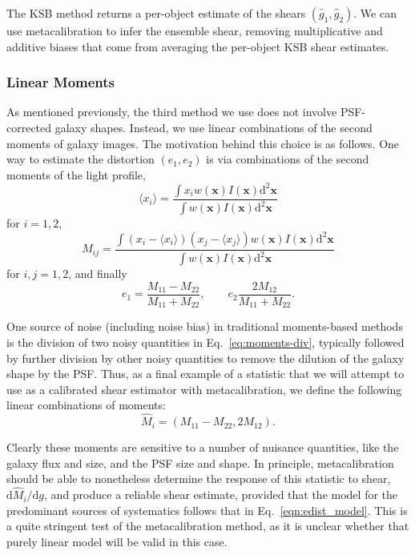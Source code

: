 \documentclass[iop]{emulateapj}
\begin{document}
The KSB method returns a per-object estimate of the shears
$(\hat{g}_1, \hat{g}_2)$. We can use metacalibration to
infer the ensemble shear, removing multiplicative and additive biases that come from averaging the
per-object KSB shear estimates.

\subsubsection{Linear Moments}

As mentioned previously, the third method we use does not involve
PSF-corrected galaxy shapes.  Instead, we use linear combinations of
the second moments of galaxy images.  The motivation behind this
choice is as follows.  One way to estimate the distortion $(e_1,e_2)$
is via combinations of the second moments of the light profile,
\begin{equation}
\langle x_i\rangle = \frac{\int x_i w({\mathbf x}) I({\mathbf x}) \mathrm{d}^2{\mathbf x}}{\int w({\mathbf x}) I({\mathbf x}) \mathrm{d}^2{\mathbf x}}
\end{equation}
for $i=1, 2$,
\begin{equation}
M_{ij} = \frac{\int (x_i-\langle x_i\rangle)(x_j-\langle x_j\rangle) w({\mathbf x}) I({\mathbf x}) \mathrm{d}^2{\mathbf x}}{\int w({\mathbf x}) I({\mathbf x}) \mathrm{d}^2{\mathbf x}}
\end{equation}
for $i,j=1,2$, and finally 
\begin{equation}\label{eq:moments-div}
e_1 = \frac{M_{11}-M_{22}}{M_{11}+M_{22}}, \qquad e_2 \frac{2M_{12}}{M_{11}+M_{22}}.
\end{equation}

One source of noise (including noise bias) in traditional moments-based methods is the
division of two noisy quantities in Eq.~\ref{eq:moments-div},
typically followed by further division by other noisy quantities to
remove the dilution of the galaxy shape by the PSF.  Thus, as a final
example of a statistic that we will attempt to use as a calibrated
shear estimator with metacalibration, we define the following linear
combinations of moments:
\begin{equation}
\hat{M}_i = (M_{11}-M_{22}, 2M_{12}).
\end{equation}

Clearly these moments are sensitive to a number of nuisance
quantities, like the galaxy flux and size, and the PSF size and shape.
In principle, metacalibration should be able to nonetheless determine
the response of this statistic to shear,
$\mathrm{d}\hat{M}_i/\mathrm{d}g$, and produce a reliable shear
estimate, provided that the model for the predominant sources of
systematics follows that in Eq.~\ref{eqn:edist_model}.  This is a
quite stringent test of the metacalibration method, as it is unclear
whether that purely linear model will be valid in this case.
\end{document}
